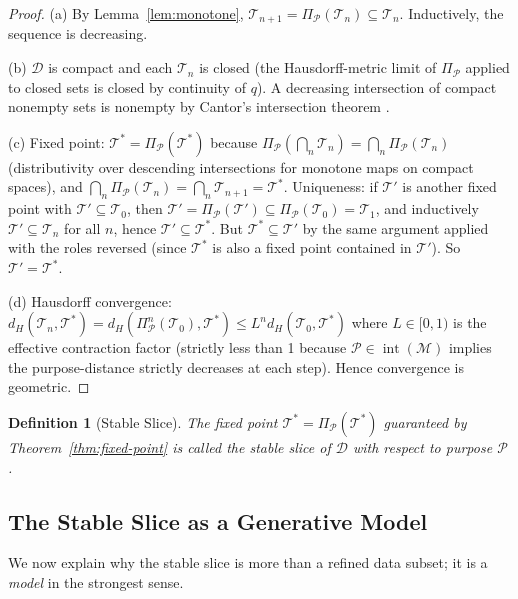 \documentclass[10pt,twocolumn]{article}
\newtheorem{definition}[theorem]{Definition}
\DeclareMathOperator{\interior}{int}
\newcommand{\ProbeOp}{\Pi_\mathcal{P}}
\newcommand{\TruthCell}{\mathcal{T}}
\newcommand{\PurposePoint}{\mathcal{P}}
\newcommand{\DataSpace}{\mathcal{D}}
\newcommand{\ManifoldM}{\mathcal{M}}
\begin{document}
\begin{proof}
(a) By Lemma~\ref{lem:monotone}, $\TruthCell_{n+1} = \ProbeOp(\TruthCell_n) \subseteq \TruthCell_n$.
Inductively, the sequence is decreasing.

(b) $\DataSpace$ is compact and each $\TruthCell_n$ is closed (the Hausdorff-metric
limit of $\ProbeOp$ applied to closed sets is closed by continuity of $q$).
A decreasing intersection of compact nonempty sets is nonempty by
Cantor's intersection theorem \cite{munkres2000}.

(c) Fixed point: $\TruthCell^* = \ProbeOp(\TruthCell^*)$ because
$\ProbeOp(\bigcap_n \TruthCell_n) = \bigcap_n \ProbeOp(\TruthCell_n)$
(distributivity over descending intersections for monotone maps on compact spaces),
and $\bigcap_n \ProbeOp(\TruthCell_n) = \bigcap_n \TruthCell_{n+1} = \TruthCell^*$.
Uniqueness: if $\TruthCell'$ is another fixed point with $\TruthCell' \subseteq \TruthCell_0$,
then $\TruthCell' = \ProbeOp(\TruthCell') \subseteq \ProbeOp(\TruthCell_0) = \TruthCell_1$,
and inductively $\TruthCell' \subseteq \TruthCell_n$ for all $n$,
hence $\TruthCell' \subseteq \TruthCell^*$. But $\TruthCell^* \subseteq \TruthCell'$
by the same argument applied with the roles reversed (since $\TruthCell^*$ is
also a fixed point contained in $\TruthCell'$). So $\TruthCell' = \TruthCell^*$.

(d) Hausdorff convergence: $d_H(\TruthCell_n, \TruthCell^*)
= d_H(\ProbeOp^n(\TruthCell_0), \TruthCell^*)
\leq L^n d_H(\TruthCell_0, \TruthCell^*)$
where $L \in [0,1)$ is the effective contraction factor (strictly less than 1
because $\PurposePoint \in \interior(\ManifoldM)$ implies the purpose-distance
strictly decreases at each step). Hence convergence is geometric.
\end{proof}

\begin{definition}[Stable Slice]
The fixed point $\TruthCell^* = \ProbeOp(\TruthCell^*)$ guaranteed by
Theorem~\ref{thm:fixed-point} is called the \emph{stable slice} of $\DataSpace$
with respect to purpose $\PurposePoint$.
\end{definition}

\subsection{The Stable Slice as a Generative Model}

We now explain why the stable slice is more than a refined data subset;
it is a \emph{model} in the strongest sense.
\end{document}
